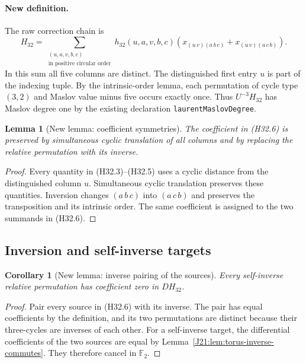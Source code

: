 \documentclass[11pt,oneside]{report}
\newtheorem{lemma}[theorem]{Lemma}
\newtheorem{corollary}[theorem]{Corollary}
\theoremstyle{definition}
\numberwithin{equation}{section}
\newcommand{\F}{\mathbb F_2}
\newcommand{\decl}[1]{\textnormal{\nolinkurl{#1}}}
\begin{document}
\paragraph{New definition.}
The raw correction chain is
\[
 H_{32}=
 \sum_{\substack{(u,a,v,b,c)\\
                  \text{in positive circular order}}}
 h_{32}(u,a,v,b,c)
 \left(
 x_{(u\,v)(a\,b\,c)}+
 x_{(u\,v)(a\,c\,b)}
 \right).
 \tag{H32.6}
\]
In this sum all five columns are distinct.
The distinguished first entry $u$ is part of the indexing tuple.
By the intrinsic-order lemma, each permutation of cycle type
$(3,2)$ and Maslov value minus five occurs exactly once.
Thus $U^{-3}H_{32}$ has Maslov degree one by the existing declaration
\decl{laurentMaslovDegree}.

\begin{lemma}[New lemma: coefficient symmetries]
\label{J21:lem:h32-invariance}
The coefficient in (H32.6) is preserved by simultaneous cyclic
translation of all columns and by replacing the relative permutation
with its inverse.
\end{lemma}
\begin{proof}
Every quantity in (H32.3)--(H32.5) uses a cyclic distance from the
distinguished column $u$. Simultaneous cyclic translation preserves
these quantities. Inversion changes $(a\,b\,c)$ into $(a\,c\,b)$
and preserves the transposition and its intrinsic order.
The same coefficient is assigned to the two summands in (H32.6).
\end{proof}

\subsection{Inversion and self-inverse targets}

\begin{corollary}[New lemma: inverse pairing of the sources]
\label{J21:cor:h32-selfinverse}
Every self-inverse relative permutation has coefficient zero in
$D H_{32}$.
\end{corollary}
\begin{proof}
Pair every source in (H32.6) with its inverse. The pair has equal
coefficients by the definition, and its two permutations are distinct
because their three-cycles are inverses of each other. For a self-inverse
target, the differential coefficients of the two sources are equal by
Lemma~\ref{J21:lem:torus-inverse-commutes}. They therefore cancel in $\F$.
\end{proof}
\end{document}
